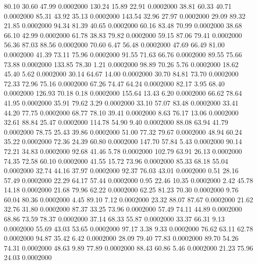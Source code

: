   80.10   30.60   47.99   0.0002000
 130.24   15.89   22.91   0.0002000
  38.81   60.33   40.71   0.0002000
  85.31   43.92   35.13   0.0002000
 143.54   32.96   27.97   0.0002000
  29.09   89.32   21.85   0.0002000
  94.34   81.39   40.65   0.0002000
  60.16   83.48   70.99   0.0002000
  38.68   66.10   42.99   0.0002000
  61.78   38.83   79.82   0.0002000
  59.15   87.06   79.41   0.0002000
  56.36   87.03   88.56   0.0002000
  70.60    6.47   56.48   0.0002000
  47.69   66.49   81.00   0.0002000
  41.39   73.11   75.96   0.0002000
  91.55   71.63   66.76   0.0002000
  89.55   75.66   73.88   0.0002000
 133.85   78.30    1.21   0.0002000
  98.89   70.26    5.76   0.0002000
  18.62   45.40    5.62   0.0002000
  30.14   64.67   14.00   0.0002000
  30.70   84.81   73.70   0.0002000
  72.33   72.96   75.16   0.0002000
  67.26   74.47   64.24   0.0002000
  82.17    3.95   68.40   0.0002000
 126.93   70.18    0.18   0.0002000
 155.64   13.43    6.20   0.0002000
  66.62   78.64   41.95   0.0002000
  35.91   79.62    3.29   0.0002000
  33.10   57.07   83.48   0.0002000
  33.41   44.20   77.75   0.0002000
  68.77   78.10   39.41   0.0002000
   8.63   76.17   13.06   0.0002000
  32.61   88.84   25.47   0.0002000
 114.78   54.90    9.40   0.0002000
  88.08   63.94   41.79   0.0002000
  78.75   25.43   39.86   0.0002000
  51.00   77.32   79.67   0.0002000
  48.94   60.24   35.22   0.0002000
  72.36   24.39   60.80   0.0002000
 147.70   57.84    5.43   0.0002000
  90.14   72.21   34.83   0.0002000
  92.68   41.46    5.78   0.0002000
 102.79   63.91   26.13   0.0002000
  74.35   72.58   60.10   0.0002000
  41.55   15.72   73.96   0.0002000
  85.33   68.18   55.04   0.0002000
  32.74   44.16   37.97   0.0002000
  92.37   76.03   43.01   0.0002000
   0.51   28.16   57.49   0.0002000
  22.29   64.17   57.44   0.0002000
   0.95   22.46   10.35   0.0002000
   2.42   45.78   14.18   0.0002000
  21.68   79.96   62.22   0.0002000
  62.25   81.23   70.30   0.0002000
   9.76   60.04   80.36   0.0002000
   4.45   89.10    7.12   0.0002000
  23.32   88.07   87.67   0.0002000
  21.62   32.76   31.80   0.0002000
  87.37   33.25   73.96   0.0002000
  57.49   74.11   44.89   0.0002000
  68.86   73.59   78.37   0.0002000
  37.14   68.33   55.87   0.0002000
  33.37   66.31    9.13   0.0002000
  55.69   43.03   53.65   0.0002000
  97.17    3.38    9.33   0.0002000
  76.62   63.11   62.78   0.0002000
  94.87   35.42    6.42   0.0002000
  28.09   79.40   77.83   0.0002000
  89.70   54.26   74.31   0.0002000
  48.63    9.89   77.89   0.0002000
  88.43   60.86    5.46   0.0002000
  21.23   75.96   24.03   0.0002000
